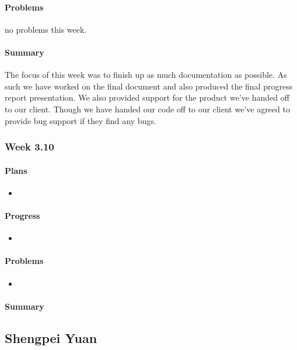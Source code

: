 \documentclass[onecolumn, draftclsnofoot,10pt, compsoc]{article}
\begin{document}
		    \paragraph{Problems} \hfill \break
		            no problems this week.\\
		    \paragraph{Summary} \hfill \break
            The focus of this week was to finish up as much documentation as possible. As such we have worked on the final document and also produced the final progress report presentation. We also provided support for the product we've handed off to our client. Though we have handed our code off to our client we've agreed to provide bug support if they find any bugs.\\
		\subsubsection{Week 3.10}
		    \paragraph{Plans} \hfill \break
		        \begin{itemize}
		            \item 
		        \end{itemize}
		    \paragraph{Progress} \hfill \break
		        \begin{itemize}
		            \item 
		        \end{itemize}
		    \paragraph{Problems} \hfill \break
		        \begin{itemize}
		            \item 
		        \end{itemize}
		    \paragraph{Summary} \hfill \break

    \subsection{Shengpei Yuan}
\end{document}
